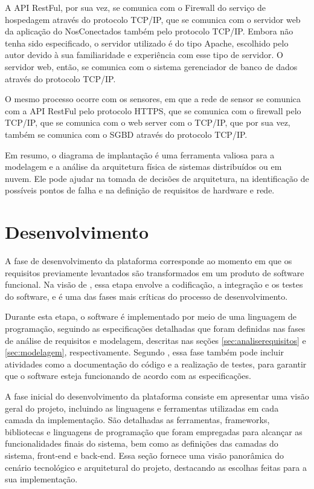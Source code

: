 \documentclass[tcc,capa]{texufpel}
\begin{document}
A API RestFul, por sua vez, se comunica com o Firewall do serviço de hospedagem através do protocolo TCP/IP, que se comunica com o servidor web da aplicação do NosConectados também pelo protocolo TCP/IP. Embora não tenha sido especificado, o servidor utilizado é do tipo Apache, escolhido pelo autor devido à sua familiaridade e experiência com esse tipo de servidor. O servidor web, então, se comunica com o sistema gerenciador de banco de dados através do protocolo TCP/IP.

O mesmo processo ocorre com os sensores, em que a rede de sensor se comunica com a API RestFul pelo protocolo HTTPS, que se comunica com o firewall pelo TCP/IP, que se comunica com o web server com o TCP/IP, que por sua vez, também se comunica com o SGBD através do protocolo TCP/IP.

Em resumo, o diagrama de implantação é uma ferramenta valiosa para a modelagem e a análise da arquitetura física de sistemas distribuídos ou em nuvem. Ele pode ajudar na tomada de decisões de arquitetura, na identificação de possíveis pontos de falha e na definição de requisitos de hardware e rede.

\section{Desenvolvimento}
\label{sec:desenvolvimento}
A fase de desenvolvimento da plataforma corresponde ao momento em que os requisitos previamente levantados são transformados em um produto de software funcional. Na visão de \citet{SOMMERVILLE:2011}, essa etapa envolve a codificação, a integração e os testes do software, e é uma das fases mais críticas do processo de desenvolvimento.

Durante esta etapa, o software é implementado por meio de uma linguagem de programação, seguindo as especificações detalhadas que foram definidas nas fases de análise de requisitos e modelagem, descritas nas seções \ref{sec:analiserequisitos} e \ref{sec:modelagem}, respectivamente. Segundo \citet{PRESSMAN:2016}, essa fase também pode incluir atividades como a documentação do código e a realização de testes, para garantir que o software esteja funcionando de acordo com as especificações.

A fase inicial do desenvolvimento da plataforma consiste em apresentar uma visão geral do projeto, incluindo as linguagens e ferramentas utilizadas em cada camada da implementação. São detalhadas as ferramentas, frameworks, bibliotecas e linguagens de programação que foram empregadas para alcançar as funcionalidades finais do sistema, bem como as definições das camadas do sistema, front-end e back-end. Essa seção fornece uma visão panorâmica do cenário tecnológico e arquitetural do projeto, destacando as escolhas feitas para a sua implementação.
\end{document}
